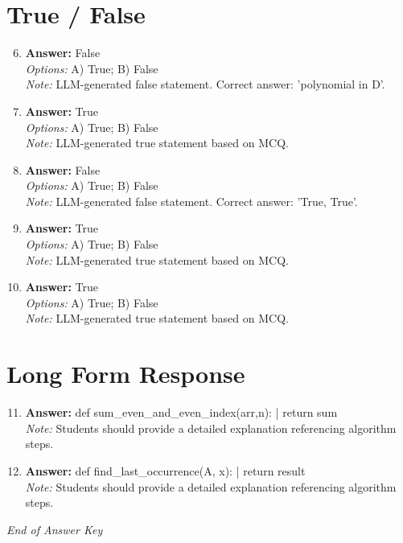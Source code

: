 \documentclass[12pt]{article}
\begin{document}
\section*{True / False}
\begin{enumerate}[label=\arabic*.]
\setcounter{enumi}{5}
\item \textbf{Answer:} False
\\ \textit{Options:} A) True; B) False
\\ \textit{Note:} LLM-generated false statement. Correct answer: 'polynomial in D'.
\item \textbf{Answer:} True
\\ \textit{Options:} A) True; B) False
\\ \textit{Note:} LLM-generated true statement based on MCQ.
\item \textbf{Answer:} False
\\ \textit{Options:} A) True; B) False
\\ \textit{Note:} LLM-generated false statement. Correct answer: 'True, True'.
\item \textbf{Answer:} True
\\ \textit{Options:} A) True; B) False
\\ \textit{Note:} LLM-generated true statement based on MCQ.
\item \textbf{Answer:} True
\\ \textit{Options:} A) True; B) False
\\ \textit{Note:} LLM-generated true statement based on MCQ.
\end{enumerate}

\section*{Long Form Response}
\begin{enumerate}[label=\arabic*.]
\setcounter{enumi}{10}
\item \textbf{Answer:} def sum\_even\_and\_even\_index(arr,n): | return sum
\\ \textit{Note:} Students should provide a detailed explanation referencing algorithm steps.
\item \textbf{Answer:} def find\_last\_occurrence(A, x): | return result
\\ \textit{Note:} Students should provide a detailed explanation referencing algorithm steps.
\end{enumerate}

\vfill
\noindent\textit{End of Answer Key}
\end{document}
